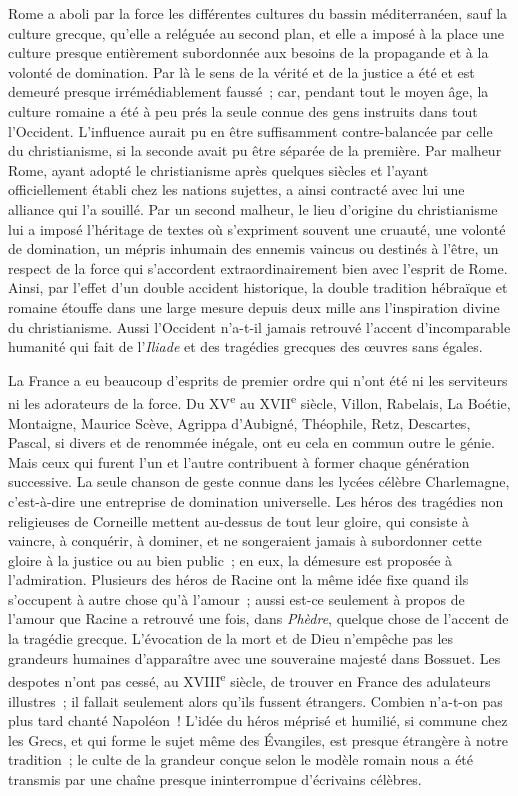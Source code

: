 \documentclass[french,twoside]{book} %
\begin{document}
Rome a aboli par la force les différentes cultures du bassin méditerranéen, sauf la culture grecque, qu'elle a reléguée au second plan, et elle a imposé à la place une culture presque entièrement subordonnée aux besoins de la propa­gande et à la volonté de domination. Par là le sens de la vérité et de la justice a été et est demeuré presque irrémédiablement faussé ; car, pendant tout le moyen âge, la culture romaine a été à peu prés la seule connue des gens instruits dans tout l'Occident. L'influence aurait pu en être suffisamment contre-balancée par celle du christianisme, si la seconde avait pu être séparée de la première. Par malheur Rome, ayant adopté le christianisme après quel­ques siècles et l'ayant officiellement établi chez les nations sujettes, a ainsi contracté avec lui une alliance qui l'a souillé. Par un second malheur, le lieu d'origine du christianisme lui a imposé l'héritage de textes où s'expriment souvent une cruauté, une volonté de domination, un mépris inhumain des ennemis vaincus ou destinés à l'être, un respect de la force qui s'accordent extraordinairement bien avec l'esprit de Rome. Ainsi, par l'effet d'un double accident historique, la double tradition hébraïque et romaine étouffe dans une large mesure depuis deux mille ans l'inspiration divine du christianisme. Aussi l'Occident n'a-t-il jamais retrouvé l'accent d'incomparable humanité qui fait de l'{\itshape Iliade} et des tragédies grecques des œuvres sans égales.\par
La France a eu beaucoup d'esprits de premier ordre qui n'ont été ni les serviteurs ni les adorateurs de la force. Du XV\textsuperscript{e} au XVII\textsuperscript{e} siècle, Villon, Rabe­lais, La Boétie, Montaigne, Maurice Scève, Agrippa d'Aubigné, Théophile, Retz, Descartes, Pascal, si divers et de renommée inégale, ont eu cela en commun outre le génie. Mais ceux qui furent l'un et l'autre contribuent à former chaque génération successive. La seule chanson de geste connue dans les lycées célèbre Charlemagne, c'est-à-dire une entreprise de domination universelle. Les héros des tragédies non religieuses de Corneille mettent au-dessus de tout leur gloire, qui consiste à vaincre, à conquérir, à dominer, et ne songeraient jamais à subordonner cette gloire à la justice ou au bien public ; en eux, la démesure est proposée à l'admiration. Plusieurs des héros de Racine ont la même idée fixe quand ils s'occupent à autre chose qu'à l'amour ; aussi est-ce seulement à propos de l'amour que Racine a retrouvé une fois, dans {\itshape Phèdre}, quelque chose de l'accent de la tragédie grecque. L'évocation de la mort et de Dieu n'empêche pas les grandeurs humaines d'apparaître avec une souveraine majesté dans Bossuet. Les despotes n'ont pas cessé, au XVIII\textsuperscript{e} siècle, de trouver en France des adulateurs illustres ; il fallait seulement alors qu'ils fussent étrangers. Combien n'a-t-on pas plus tard chanté Napoléon ! L'idée du héros méprisé et humilié, si commune chez les Grecs, et qui forme le sujet même des Évangiles, est presque étrangère à notre tradition ; le culte de la grandeur conçue selon le modèle romain nous a été transmis par une chaîne presque ininterrompue d'écrivains célèbres.\par
\end{document}
